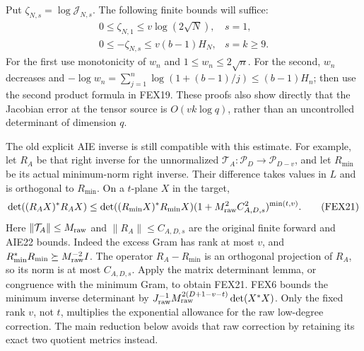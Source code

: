 \documentclass[11pt,a4paper]{article}
\begin{document}
Put $\zeta_{N,s}=\log\mathscr J_{N,s}$. The following finite bounds
will suffice:
\[
\begin{array}{ll}
 0\le\zeta_{N,1}\le v\log(2\sqrt N),&s=1,\\[2pt]
 0\le-\zeta_{N,s}\le v(b-1)H_N,&s=k\ge9.
\end{array}\tag{FEX20}
\]
For the first use monotonicity of $w_n$ and $1\le w_n\le2\sqrt n$.
For the second, $w_n$ decreases and
$-\log w_n=\sum_{j=1}^n\log(1+(b-1)/j)\le(b-1)H_n$; then use the second
product formula in FEX19. These proofs also show directly that the
Jacobian error at the tensor source is $O(vk\log q)$, rather than an
uncontrolled determinant of dimension $q$.

The old explicit AIE inverse is still compatible with this estimate.
For example, let $R_A$ be that right inverse for the unnormalized
$\mathcal T_A:\mathcal P_D\to\mathcal P_{D-v}$, and let $R_{\min}$ be
its actual minimum-norm right inverse. Their difference takes values in
$L$ and is orthogonal to $R_{\min}$. On a $t$-plane $X$ in the target,
\[
 \det((R_AX)^*R_AX)
 \le \det((R_{\min}X)^*R_{\min}X)
       (1+M_{\rm raw}^2 C_{A,D,s}^2)^{\min(t,v)}.
 \tag{FEX21}
\]
Here $\|\mathcal T_A\|\le M_{\rm raw}$ and $\|R_A\|\le C_{A,D,s}$
are the original finite forward and AIE22 bounds. Indeed the excess
Gram has rank at most $v$, and $R_{\min}^*R_{\min}\succeq
M_{\rm raw}^{-2}I$. The operator $R_A-R_{\min}$ is an orthogonal
projection of $R_A$, so its norm is at most $C_{A,D,s}$. Apply the
matrix determinant lemma, or congruence with the minimum Gram, to obtain
FEX21. FEX6 bounds the minimum inverse determinant by
$J_{\rm raw}^{-1}M_{\rm raw}^{2(D+1-v-t)}\det(X^*X)$.
Only the fixed rank $v$, not $t$, multiplies the exponential allowance
for the raw low-degree correction. The main reduction below avoids that
raw correction by retaining its exact two quotient metrics instead.
\end{document}
